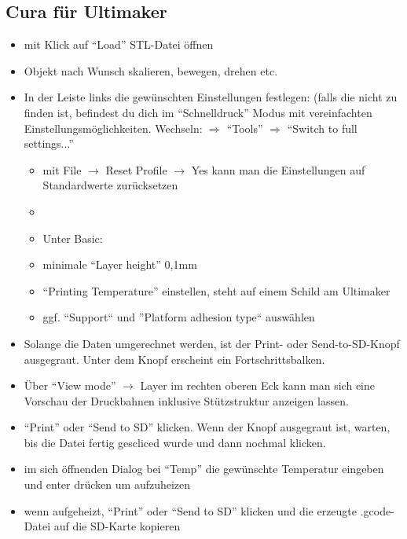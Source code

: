 \documentclass{\basedir/fablab-document}
\begin{document}
\subsection{Cura für Ultimaker}
\begin{itemize}
\item mit Klick auf ``Load'' STL-Datei öffnen
\item Objekt nach Wunsch skalieren, bewegen, drehen etc.
\item In der Leiste links die gewünschten Einstellungen festlegen: (falls die nicht zu finden ist, befindest du dich im ``Schnelldruck'' Modus mit vereinfachten Einstellungsmöglichkeiten. Wechseln: $\Rightarrow$ ``Tools'' $\Rightarrow$ ``Switch to full settings...''
 \begin{itemize}
  \item mit File $\rightarrow$ Reset Profile $\rightarrow$ Yes kann man die Einstellungen auf Standardwerte zurücksetzen
  \item {}
  \item Unter Basic:
  \item minimale ``Layer height'' 0,1mm
  \item ``Printing Temperature'' einstellen, steht auf einem Schild am Ultimaker
  \item ggf. ``Support`` und ''Platform adhesion type`` auswählen
 \end{itemize}
\item Solange die Daten umgerechnet werden, ist der Print- oder Send-to-SD-Knopf ausgegraut. Unter dem Knopf erscheint ein Fortschrittsbalken.
\item Über \enquote{View mode} $\rightarrow$ Layer im rechten oberen Eck kann man sich eine Vorschau der Druckbahnen inklusive Stützstruktur anzeigen lassen.
\item ``Print'' oder ``Send to SD'' klicken. Wenn der Knopf ausgegraut ist, warten, bis die Datei fertig gescliced wurde und dann nochmal klicken.
\item im sich öffnenden Dialog bei ``Temp'' die gewünschte Temperatur eingeben und enter drücken um aufzuheizen
\item wenn aufgeheizt, ``Print'' oder ``Send to SD'' klicken und die erzeugte .gcode-Datei auf die SD-Karte kopieren
\end{itemize}
\end{document}
